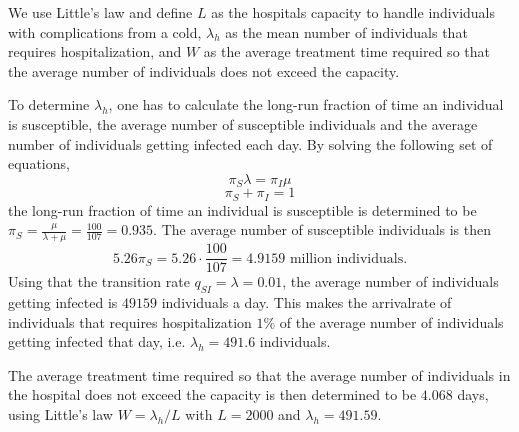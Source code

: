 We use Little's law and define $L$ as the hospitals capacity to handle individuals with complications from a cold, $\lambda_h$ as the mean number of individuals that requires hospitalization, and $W$ as the average treatment time required so that the average number of individuals does not exceed the capacity. 

To determine $\lambda_h$, one has to calculate the long-run fraction of time an individual is susceptible, the average number of susceptible individuals and the average number of individuals getting infected each day. By solving the following set of equations, 
$$ \pi_S \lambda = \pi_I \mu$$ 
$$ \pi_S + \pi_I = 1 $$
the long-run fraction of time an individual is susceptible is determined to be $\pi_S = \frac{\mu}{\lambda + \mu} = \frac{100}{107} = 0.935.$
The average number of susceptible individuals is then 
$$ 5.26  \pi_S = 5.26 \cdot \frac{100}{107} = 4.9159 \text{ million individuals.}$$
Using that the transition rate $ q_{SI} = \lambda = 0.01$, the average number of individuals getting infected is $49159$ individuals a day. This makes the arrivalrate of individuals that requires hospitalization $1\%$ of the average number of individuals getting infected that day, i.e. $\lambda_h = 491.6$ individuals. 

The average treatment time required so that the average number of individuals in the hospital does not exceed the capacity is then determined to be $4.068$ days, using Little's law $W = \lambda_h/L$ with $L = 2000$ and $\lambda_h = 491.59$. 





